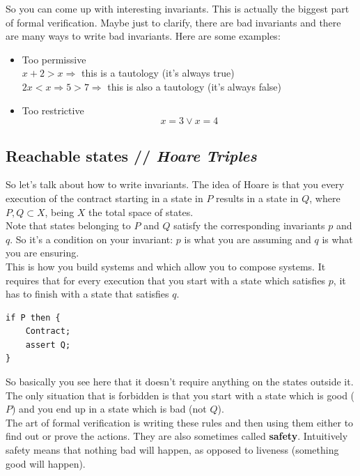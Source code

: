\documentclass[oneside]{book}
\begin{document}
    So you can come up with interesting invariants.
    This is actually the biggest part of formal verification.
    Maybe just to clarify, there are bad invariants and there are many ways to write bad invariants.
    Here are some examples:

    \begin{itemize}
        \item Too permissive\\
            $x+2>x \Rightarrow$ this is a tautology (it's always true)\\
            $2x<x \Rightarrow 5>7 \Rightarrow$ this is also a tautology (it's always false)
        \item Too restrictive
            $$x=3\vee x=4$$
    \end{itemize}

    \subsection{Reachable states // \textit{Hoare Triples}}

    So let's talk about how to write invariants.
   The idea of Hoare is that you every execution of the contract starting in a state in $P$ results in a state in $Q$, where $P,Q\subset X$, being $X$ the total space of states.\\

    Note that states belonging to $P$ and $Q$ satisfy the corresponding invariants $p$ and $q$.
    So it's a condition on your invariant: $p$ is what you are assuming and $q$ is what you are ensuring.\\

    This is how you build systems and which allow you to compose systems.
    It requires that for every execution that you start with a state which satisfies $p$, it has to finish with a state that satisfies $q$.

    \begin{lstlisting}[language=Solidity, style=SolStyle]
if P then {
    Contract;
    assert Q;
}
\end{lstlisting}

    So basically you see here that it doesn't require anything on the states outside it.
    The only situation that is forbidden is that you start with a state which is good ($P$) and you end up in a state which is bad (not $Q$).\\

    The art of formal verification is writing these rules and then using them either to find out or prove the actions.
    They are also sometimes called \textbf{safety}.
    Intuitively safety means that nothing bad will happen, as opposed to liveness (something good will happen).\\
\end{document}
